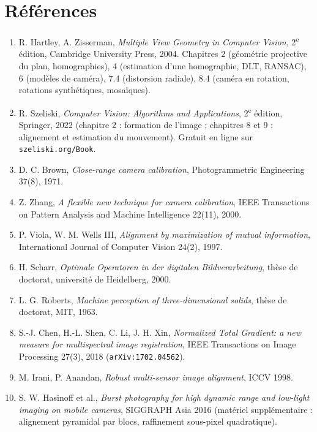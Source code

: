 \documentclass[a4paper,11pt]{report}
\begin{document}
\section{Références}\label{sec:ann_references}
{\renewcommand{\labelenumi}{[\arabic{enumi}]}
\begin{enumerate}
	\item\label{ann_hz} R. Hartley, A. Zisserman, \emph{Multiple View Geometry in Computer Vision}, 2\textsuperscript{e} édition, Cambridge University Press, 2004. Chapitres 2 (géométrie projective du plan, homographies), 4 (estimation d'une homographie, DLT, RANSAC), 6 (modèles de caméra), 7.4 (distorsion radiale), 8.4 (caméra en rotation, rotations synthétiques, mosaïques).
	\item\label{ann_szeliski} R. Szeliski, \emph{Computer Vision: Algorithms and Applications}, 2\textsuperscript{e} édition, Springer, 2022 (chapitre 2 : formation de l'image ; chapitres 8 et 9 : alignement et estimation du mouvement). Gratuit en ligne sur \texttt{szeliski.org/Book}.
	\item\label{ann_brown} D. C. Brown, \emph{Close-range camera calibration}, Photogrammetric Engineering 37(8), 1971.
	\item\label{ann_zhang} Z. Zhang, \emph{A flexible new technique for camera calibration}, IEEE Transactions on Pattern Analysis and Machine Intelligence 22(11), 2000.
	\item\label{ann_viola} P. Viola, W. M. Wells III, \emph{Alignment by maximization of mutual information}, International Journal of Computer Vision 24(2), 1997.
	\item\label{ann_scharr} H. Scharr, \emph{Optimale Operatoren in der digitalen Bildverarbeitung}, thèse de doctorat, université de Heidelberg, 2000.
	\item\label{ann_roberts} L. G. Roberts, \emph{Machine perception of three-dimensional solids}, thèse de doctorat, MIT, 1963.
	\item\label{ann_ntg} S.-J. Chen, H.-L. Shen, C. Li, J. H. Xin, \emph{Normalized Total Gradient: a new measure for multispectral image registration}, IEEE Transactions on Image Processing 27(3), 2018 (\texttt{arXiv:1702.04562}).
	\item\label{ann_irani} M. Irani, P. Anandan, \emph{Robust multi-sensor image alignment}, ICCV 1998.
	\item\label{ann_hasinoff} S. W. Hasinoff et al., \emph{Burst photography for high dynamic range and low-light imaging on mobile cameras}, SIGGRAPH Asia 2016 (matériel supplémentaire : alignement pyramidal par blocs, raffinement sous-pixel quadratique).

\end{enumerate}}
\end{document}

